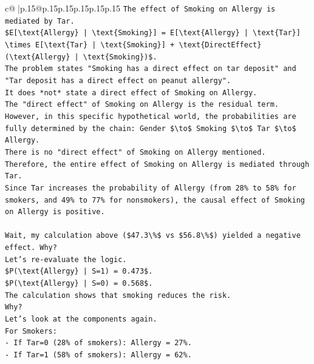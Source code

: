 \documentclass{article}
\begin{document}
{\begin{supertabular}{c@{$\;$}|p{.15\linewidth}@{}p{.15\linewidth}p{.15\linewidth}p{.15\linewidth}p{.15\linewidth}p{.15\linewidth}}
{{{\texttt{The effect of Smoking on Allergy is mediated by Tar.} \\
\texttt{\$E{[}\textbackslash{}text\{Allergy\} | \textbackslash{}text\{Smoking\}{]} = E{[}\textbackslash{}text\{Allergy\} | \textbackslash{}text\{Tar\}{]} \textbackslash{}times E{[}\textbackslash{}text\{Tar\} | \textbackslash{}text\{Smoking\}{]} + \textbackslash{}text\{DirectEffect\}(\textbackslash{}text\{Allergy\} | \textbackslash{}text\{Smoking\})\$.} \\
\texttt{The problem states "Smoking has a direct effect on tar deposit" and "Tar deposit has a direct effect on peanut allergy".} \\
\texttt{It does *not* state a direct effect of Smoking on Allergy.} \\
\texttt{The "direct effect" of Smoking on Allergy is the residual term.} \\
\texttt{However, in this specific hypothetical world, the probabilities are fully determined by the chain: Gender \$\textbackslash{}to\$ Smoking \$\textbackslash{}to\$ Tar \$\textbackslash{}to\$ Allergy.} \\
\texttt{There is no "direct effect" of Smoking on Allergy mentioned.} \\
\texttt{Therefore, the entire effect of Smoking on Allergy is mediated through Tar.} \\
\texttt{Since Tar increases the probability of Allergy (from 28\% to 58\% for smokers, and 49\% to 77\% for nonsmokers), the causal effect of Smoking on Allergy is positive.} \\
\\ 
\texttt{Wait, my calculation above (\$47.3\textbackslash{}\%\$ vs \$56.8\textbackslash{}\%\$) yielded a negative effect. Why?} \\
\texttt{Let's re{-}evaluate the logic.} \\
\texttt{\$P(\textbackslash{}text\{Allergy\} | S=1) = 0.473\$.} \\
\texttt{\$P(\textbackslash{}text\{Allergy\} | S=0) = 0.568\$.} \\
\texttt{The calculation shows that smoking reduces the risk.} \\
\texttt{Why?} \\
\texttt{Let's look at the components again.} \\
\texttt{For Smokers:} \\
\texttt{{-} If Tar=0 (28\% of smokers): Allergy = 27\%.} \\
\texttt{{-} If Tar=1 (58\% of smokers): Allergy = 62\%.} \\
}}}
\end{supertabular}}
\end{document}

